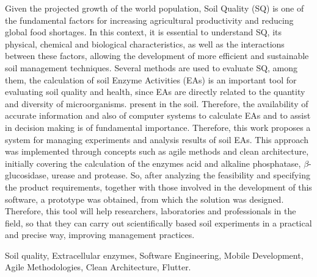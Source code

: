 Given the projected growth of the world population, Soil Quality (SQ) is one of the fundamental factors for increasing agricultural productivity and reducing global food shortages. In this context, it is essential to understand SQ, its physical, chemical and biological characteristics, as well as the interactions between these factors, allowing the development of more efficient and sustainable soil management techniques. Several methods are used to evaluate SQ, among them, the calculation of soil Enzyme Activities (EAs) is an important tool for evaluating soil quality and health, since EAs are directly related to the quantity and diversity of microorganisms. present in the soil. Therefore, the availability of accurate information and also of computer systems to calculate EAs and to assist in decision making is of fundamental importance. Therefore, this work proposes a system for managing experiments and analysis results of soil EAs. This approach was implemented through concepts such as agile methods and clean architecture, initially covering the calculation of the enzymes acid and alkaline phosphatase, $\beta$-glucosidase, urease and protease. So, after analyzing the feasibility and specifying the product requirements, together with those involved in the development of this software, a prototype was obtained, from which the solution was designed. Therefore, this tool will help researchers, laboratories and professionals in the field, so that they can carry out scientifically based soil experiments in a practical and precise way, improving management practices.

\begin{keywords}
Soil quality, Extracellular enzymes, Software Engineering, Mobile Development, Agile Methodologies, Clean Architecture, Flutter.
\end{keywords}